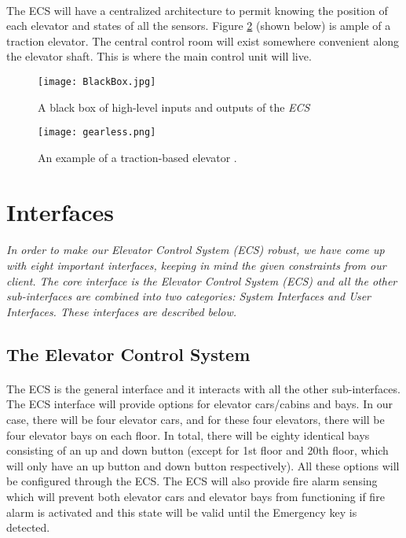 \documentclass[12pt]{article}
\begin{document}
\paragraph{} The ECS will have a centralized architecture to permit knowing the position of each elevator and states of all the sensors. Figure \ref{fig:gearless} (shown below) is ample of a traction elevator. The central control room will exist somewhere convenient along the elevator shaft. This is where the main control unit will live.
\pagebreak
\begin{figure}[h!]
	\centering
  \texttt{[image: BlackBox.jpg]}
  \caption{A black box of high-level inputs and outputs of the \textit{ECS}}
  \label{fig:bb}
\end{figure}
\vfill
\begin{figure}[h!]
	\centering
  \texttt{[image: gearless.png]}
  \caption{An example of a traction-based elevator \cite{trac}.}
  \label{fig:gearless}
\end{figure}
\pagebreak
\section{Interfaces} %
\label{int}
\paragraph{} \textit{In order to make our Elevator Control System (ECS) robust, we have come up with eight important interfaces, keeping in mind the given constraints from our client. The core interface is the Elevator Control System (ECS) and all the other sub-interfaces are combined into two categories: System Interfaces and User Interfaces. These interfaces are described below.}

\subsection{The Elevator Control System}
\paragraph{} The ECS is the general interface and it interacts with all the other sub-interfaces. The ECS interface will provide options for elevator cars/cabins and bays. In our case, there will be four elevator cars, and for these four elevators, there will be four elevator bays on each floor. In total, there will be eighty identical bays consisting of an up and down button (except for 1st floor and 20th floor, which will only have an up button and down button respectively). All these options will be configured through the ECS. The ECS will also provide fire alarm sensing which will prevent both elevator cars and elevator bays from functioning if fire alarm is activated and this state will be valid until the Emergency key is detected.
\end{document}
